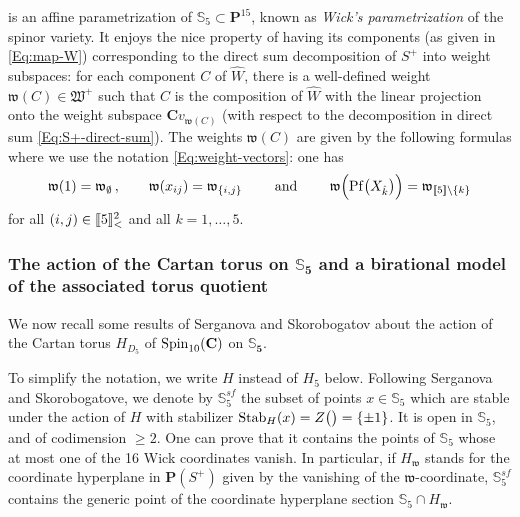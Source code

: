 \documentclass[11pt]{amsart}
\newcommand{\sk}{\smallskip}
\begin{document}
is an affine parametrization of $\mathbb S_5\subset \mathbf P^{15}$, known as {\it Wick's parametrization} of the spinor variety.  It enjoys the nice property of having its components (as given in \eqref{Eq:map-W}) corresponding to the direct sum decomposition 
of $S^+$ into weight subspaces:  for each component $C$ of $\widehat{W}$, there is a 
well-defined weight $\mathfrak w(C)\in \mathfrak W^+$ such that $C$ is 
the composition of $\widehat{W}$ with the linear projection onto the 
weight subspace $\mathbf C v_{\mathfrak w(C)}$ 
(with respect to the decomposition in direct sum \eqref{Eq:S+-direct-sum}). 
The weights $\mathfrak w(C)$ are given by the following formulas where we use the notation \eqref{Eq:weight-vectors}: 
 one has 
$$
\mathfrak w(1)=\mathfrak w_{\emptyset}\, , \qquad 
\mathfrak w(x_{ij})=\mathfrak w_{ \{i,j\}}
\qquad \mbox{ and } \qquad 
\mathfrak w\Big( {\rm Pf}\big( X_{\hat k}\big)\Big)=\mathfrak w_{  [\hspace{-0,05cm}[5]\hspace{-0,05cm}] \setminus \{k\}}
$$
for all $(i,j)\in  [\hspace{-0,05cm}[5]\hspace{-0,05cm}]_<^2$ and all $k=1,\ldots,5$.
%
%
%
%

\subsubsection{\bf The action of the Cartan torus on $\boldsymbol{\mathbb S_5}$ and a birational model of the associated torus quotient}
We now recall some results of Serganova and Skorobogatov about the action of the Cartan torus $H_{D_5}$ of ${\rm Spin}_{10}(\mathbf C)$ on $\boldsymbol{\mathbb S_5}$.  
\sk 

To simplify the notation, we write $H$ instead of $H_5$ below. 
Following Serganova and Skorobogatove, we denote by $\boldsymbol{\mathbb S}^{sf}_5$ the subset of points $x\in \mathbb S_5$ which are stable under the action of $H$ with stabilizer ${\rm Stab}_{H}(x)=Z\big( \big)=\{ \pm 1\}$. It is open in $\mathbb S_{5}$, and of codimension $\geq 2$. One can prove that it contains the points of $\mathbb S_5$ whose at most one of the 16 Wick coordinates vanish. In particular, if $H_{\mathfrak w}$ stands for the coordinate hyperplane in $\mathbf P(S^+)$ given by the vanishing of the $\mathfrak w$-coordinate, 
$\boldsymbol{\mathbb S}^{sf}_5$ contains the generic point of the coordinate hyperplane section $\mathbb S_5\cap H_{\mathfrak w}$. \sk 
\end{document}
